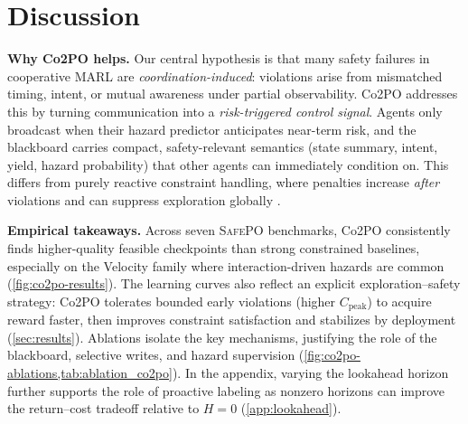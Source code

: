 \documentclass{article}
\theoremstyle{plain}
\theoremstyle{definition}
\theoremstyle{remark}
\begin{document}
\section{Discussion}
\label{sec:conclusion}

\textbf{Why Co2PO helps.}
Our central hypothesis is that many safety failures in cooperative MARL are \emph{coordination-induced}: violations arise from mismatched timing, intent, or mutual awareness under partial observability. Co2PO addresses this by turning communication into a \emph{risk-triggered control signal}. Agents only broadcast when their hazard predictor anticipates near-term risk, and the blackboard carries compact, safety-relevant semantics (state summary, intent, yield, hazard probability) that other agents can immediately condition on. This differs from purely reactive constraint handling, where penalties increase \emph{after} violations and can suppress exploration globally \cite{brunke2022safelearning, gu2023macpo}.


\textbf{Empirical takeaways.}
Across seven \textsc{SafePO} benchmarks, Co2PO consistently finds higher-quality feasible checkpoints than strong constrained baselines, especially on the Velocity family where interaction-driven hazards are common (\cref{fig:co2po-results}). The learning curves also reflect an explicit exploration--safety strategy: Co2PO tolerates bounded early violations (higher $C_{\text{peak}}$) to acquire reward faster, then improves constraint satisfaction and stabilizes by deployment (\cref{sec:results}). Ablations isolate the key mechanisms, justifying the role of the blackboard, selective writes, and hazard supervision (\cref{fig:co2po-ablations,tab:ablation_co2po}). In the appendix, varying the lookahead horizon further supports the role of proactive labeling as nonzero horizons can improve the return--cost tradeoff relative to $H\!=\!0$ (\cref{app:lookahead}).
\end{document}
